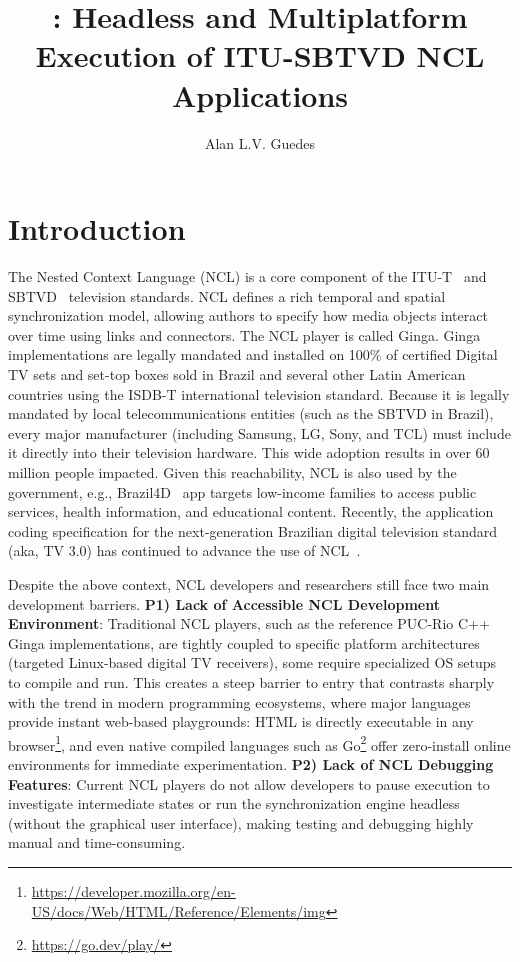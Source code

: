 \documentclass[sigconf,authorversion,review,authordraft]{acmart}
\title{\projectname{}: Headless and Multiplatform Execution of ITU-SBTVD NCL Applications}
\author{Alan L.V. Guedes}
\affiliation{%
  \institution{Computer Science, University of Reading}
  \city{Reading}
  \country{UK}
}
\begin{document}
\maketitle

\section{Introduction}

The Nested Context Language (NCL) is a core component of the ITU-T~\cite{ITU_H761} and SBTVD~\cite{abnt_15606_2_2023} television standards. NCL defines a rich temporal and spatial synchronization model, allowing authors to specify how media objects interact over time using links and connectors. The NCL player is called Ginga. Ginga implementations are legally mandated and installed on 100\% of certified Digital TV sets and set-top boxes sold in Brazil and several other Latin American countries using the ISDB-T international television standard. Because it is legally mandated by local telecommunications entities (such as the SBTVD in Brazil), every major manufacturer (including Samsung, LG, Sony, and TCL) must include it directly into their television hardware. This wide adoption results in over 60 million people impacted. Given this reachability, NCL is also used by the government, e.g., Brazil4D~\cite{castro2016brazil} app targets low-income families to access public services, health information, and educational content. Recently, the application coding specification for the next-generation Brazilian digital television standard (aka, TV 3.0) has continued to advance the use of NCL~\cite{santos2026overview}.

Despite the above context, NCL developers and researchers still face two main development barriers. \textbf{P1) Lack of Accessible NCL Development Environment}: Traditional NCL players, such as the reference PUC-Rio C++ Ginga implementations, are tightly coupled to specific platform architectures (targeted Linux-based digital TV receivers), some require specialized OS setups to compile and run. This creates a steep barrier to entry that contrasts sharply with the trend in modern programming ecosystems, where major languages provide instant web-based playgrounds: HTML is directly executable in any browser\footnote{\url{https://developer.mozilla.org/en-US/docs/Web/HTML/Reference/Elements/img}}, and even native compiled languages such as Go\footnote{\url{https://go.dev/play/}} offer zero-install online environments for immediate experimentation. \textbf{P2) Lack of NCL Debugging Features}: Current NCL players do not allow developers to pause execution to investigate intermediate states or run the synchronization engine headless (without the graphical user interface), making testing and debugging highly manual and time-consuming.
\end{document}
